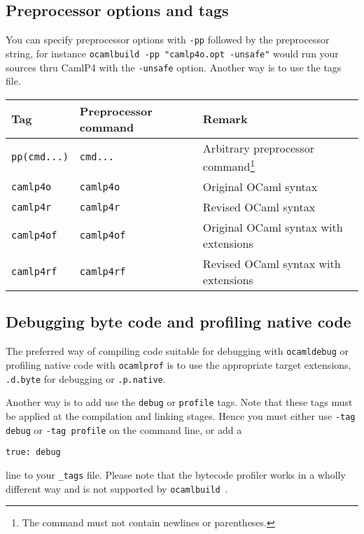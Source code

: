 \documentclass[12pt]{article}
\newcommand{\ocb}{\texttt{ocamlbuild}~}
\begin{document}
\subsection{Preprocessor options and tags}
You can specify preprocessor options with \texttt{-pp} followed by the
preprocessor string, for instance \texttt{ocamlbuild -pp "camlp4o.opt -unsafe"}
would run your sources thru CamlP4 with the \texttt{-unsafe} option.
Another way is to use the tags file.  
\begin{center}
  \begin{tabular}{|l|l|l|}
    \hline
    \textbf{Tag}        & \textbf{Preprocessor command} & \textbf{Remark} \\
    \hline
    \hline
    \texttt{pp(cmd...)} & \texttt{cmd...}               & Arbitrary
        preprocessor command\footnote{The command must not contain newlines or parentheses.} \\
    \hline
    \texttt{camlp4o}    & \texttt{camlp4o}              & Original OCaml syntax \\
    \hline
    \texttt{camlp4r}    & \texttt{camlp4r}              & Revised OCaml syntax \\
    \hline
    \texttt{camlp4of}   & \texttt{camlp4of}             & Original OCaml syntax with extensions \\
    \hline
    \texttt{camlp4rf}   & \texttt{camlp4rf}             & Revised OCaml syntax with extensions \\
    \hline
  \end{tabular}
\end{center}
\subsection{Debugging byte code and profiling native code}
The preferred way of compiling code suitable for debugging with \texttt{ocamldebug} or
profiling native code with \texttt{ocamlprof} is to use the appropriate target
extensions, \texttt{.d.byte} for debugging or \texttt{.p.native}.

Another way is to add use the \texttt{debug} or \texttt{profile} tags.
Note that these tags must be applied at the compilation and linking stages.
Hence you must either use \texttt{-tag debug} or \texttt{-tag profile}
on the command line, or add a
\begin{verbatim}
true: debug
\end{verbatim}
line to your \texttt{\_tags} file.
Please note that the bytecode profiler works in a wholly different way
and is not supported by \ocb.
\end{document}
